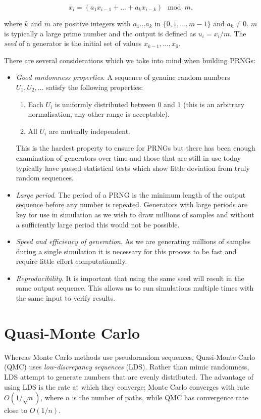 \begin{equation*}
    x_i = (a_1 x_{i-1} + \dots + a_k x_{i-k}) \mod{m},
\end{equation*}

where $k$ and $m$ are positive integers with $a_1 \dots a_k$ in $\{0, 1, \dots , m-1\}$ and $a_k \neq 0$. $m$ is typically a large prime number and the output is defined as $u_i = x_i / m$. The \textit{seed} of a generator is the initial set of values $x_{k-1}, \dots, x_0$.

There are several considerations which we take into mind when building PRNGs:
\begin{itemize}
    \item \textit{Good randomness properties}. A sequence of genuine random numbers $U_1, U_2, \dots$ satisfy the following properties:
    \begin{enumerate}
        \item Each $U_i$ is uniformly distributed between 0 and 1 (this is an arbitrary normalisation, any other range is acceptable).
        \item All $U_i$ are mutually independent.
    \end{enumerate}
    This is the hardest property to ensure for PRNGs but there has been enough examination of generators over time and those that are still in use today typically have passed statistical tests which show little deviation from truly random sequences.
    \item \textit{Large period}. The period of a PRNG is the minimum length of the output sequence before any number is repeated. Generators with large periods are key for use in simulation as we wish to draw millions of samples and without a sufficiently large period this would not be possible.
    \item \textit{Speed and efficiency of generation}. As we are generating millions of samples during a single simulation it is necessary for this process to be fast and require little effort computationally.
    \item \textit{Reproducibility}. It is important that using the same seed will result in the same output sequence. This allows us to run simulations multiple times with the same input to verify results.
\end{itemize}

\section{Quasi-Monte Carlo} \label{sec:quasimc}
Whereas Monte Carlo methods use pseudorandom sequences, Quasi-Monte Carlo (QMC) uses \textit{low-discrepancy sequences} (LDS). Rather than mimic randomness, LDS attempt to generate numbers that are evenly distributed. The advantage of using LDS is the rate at which they converge; Monte Carlo converges with rate $O(1/\sqrt{n})$, where $n$ is the number of paths, while QMC has convergence rate close to $O(1/n)$. 

